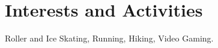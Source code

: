 \documentclass[a4paper,10pt]{article} %
\begin{document}

\section{Interests and Activities}

Roller and Ice Skating, Running, Hiking, Video Gaming.



%
\end{document}
